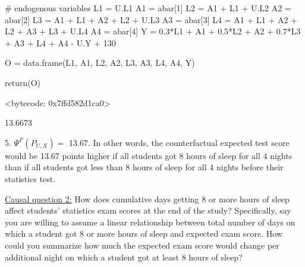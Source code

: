\documentclass[answers]{exam}
\begin{document}
\begin{solution}
\begin{Schunk}
\begin{Soutput}
{  # endogenous variables
  L1 = U.L1
  A1 = abar[1]
  L2 = A1 + L1 + U.L2
  A2 = abar[2]
  L3 = A1 + L1 + A2 + L2 + U.L3
  A3 = abar[3]
  L4 = A1 + L1 + A2 + L2 + A3 + L3 + U.L4
  A4 = abar[4]
  Y = 0.3*L1 + A1 + 0.5*L2 + A2 + 0.7*L3 + A3 + L4 + A4 - U.Y + 130
  
  O = data.frame(L1, A1, L2, A2, L3, A3, L4, A4, Y)
  
  return(O)
}
<bytecode: 0x7ffd582d1ca0>
\end{Soutput}
\end{Schunk}

\begin{Schunk}
\begin{Soutput}
[1] 13.6673
\end{Soutput}
\end{Schunk}


5. $\Psi^F(P_{U,X}) = $ 13.67. In other words, the counterfactual expected test score would be 13.67 points higher if all students got 8 hours of sleep for all 4 nights than if all students got less than 8 hours of sleep for all 4 nights before their statistics test.
\end{solution}

\vspace{4mm}
\noindent \underline{Causal question 2:} How does cumulative days getting 8 or more hours of sleep affect students' statistics exam scores at the end of the study? Specifically, say you are willing to assume a linear relationship between total number of days on which a student got 8 or more hours of sleep and expected exam score. How could you summarize how much the expected exam score would change per additional night on which a student got at least 8 hours of sleep?
\end{document}
